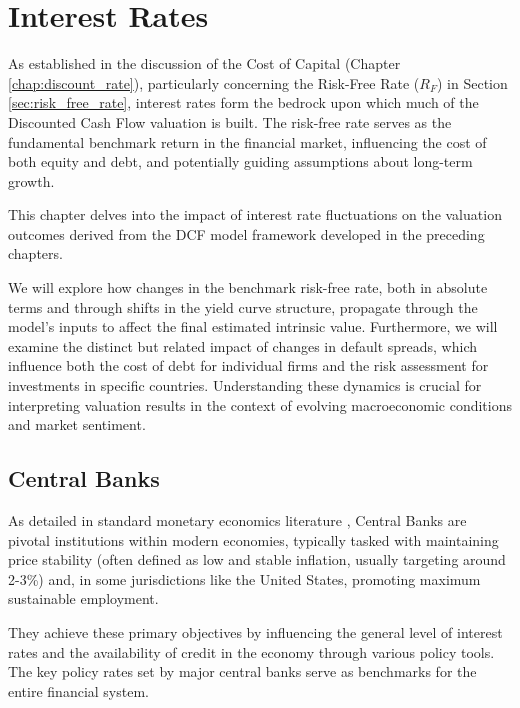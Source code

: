 \chapter{Interest Rates} \label{chap:interest_rates}

As established in the discussion of the Cost of Capital (Chapter \ref{chap:discount_rate}), particularly concerning the Risk-Free Rate (\(R_F\)) in Section \ref{sec:risk_free_rate}, interest rates form the bedrock upon which much of the Discounted Cash Flow valuation is built. The risk-free rate serves as the fundamental benchmark return in the financial market, influencing the cost of both equity and debt, and potentially guiding assumptions about long-term growth.

This chapter delves into the impact of interest rate fluctuations on the valuation outcomes derived from the DCF model framework developed in the preceding chapters. 

We will explore how changes in the benchmark risk-free rate, both in absolute terms and through shifts in the yield curve structure, propagate through the model's inputs to affect the final estimated intrinsic value. Furthermore, we will examine the distinct but related impact of changes in default spreads, which influence both the cost of debt for individual firms and the risk assessment for investments in specific countries. Understanding these dynamics is crucial for interpreting valuation results in the context of evolving macroeconomic conditions and market sentiment.

\section{Central Banks} \label{sec:central_banks}
As detailed in standard monetary economics literature \parencite{mishkin2019economics}, Central Banks are pivotal institutions within modern economies, typically tasked with maintaining price stability (often defined as low and stable inflation, usually targeting around 2-3\%) and, in some jurisdictions like the United States, promoting maximum sustainable employment. 

They achieve these primary objectives by influencing the general level of interest rates and the availability of credit in the economy through various policy tools. The key policy rates set by major central banks serve as benchmarks for the entire financial system.

